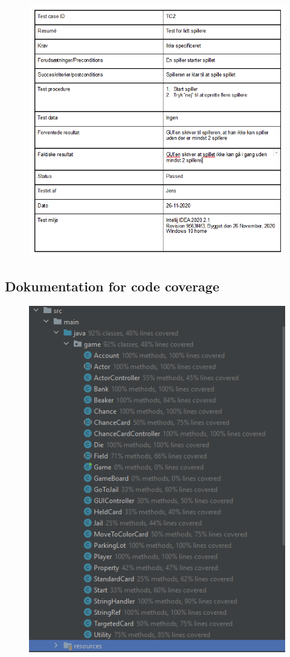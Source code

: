 \newpage
\begin{figure}[h!]
\centering
\includegraphics[scale=1]{artifacts/TC2.png}
\end{figure}
\newpage
\subsection{Dokumentation for code coverage}
\begin{figure}[h!]
\centering
\includegraphics[scale=0.8]{artifacts/codeCoverageTest.png}
\end{figure}